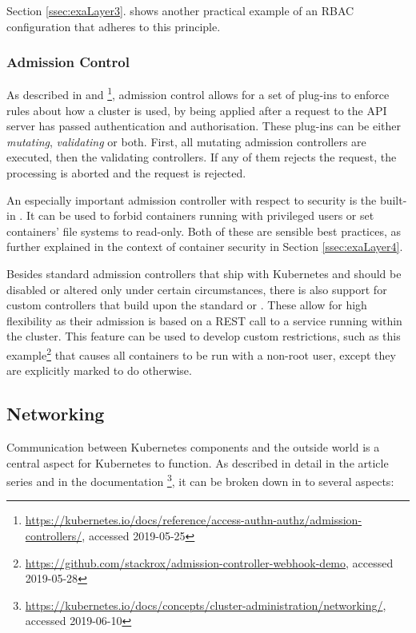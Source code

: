 Section \ref{ssec:exaLayer3}. shows another practical example of an \ac{RBAC} configuration that adheres to this principle.

\subsubsection{Admission Control} \label{ssec:admissionControl}

As described in \cite{admissionControl} and \cite{k8sdocs}\footnote{\url{https://kubernetes.io/docs/reference/access-authn-authz/admission-controllers/}, accessed 2019-05-25}, admission control allows for a set of plug-ins to enforce rules about how a cluster is used, by being applied after a request to the API server has passed authentication and authorisation. These plug-ins can be either \textit{mutating}, \textit{validating} or both. First, all mutating admission controllers are executed, then the validating controllers. If any of them rejects the request, the processing is aborted and the request is rejected.

An especially important admission controller with respect to security is the built-in . It can be used to forbid containers running with privileged users or set containers' file systems to read-only. Both of these are sensible best practices, as further explained in the context of container security in Section \ref{ssec:exaLayer4}.

Besides standard admission controllers that ship with Kubernetes and should be disabled or altered only under certain circumstances, there is also support for custom controllers that build upon the standard  or . These allow for high flexibility as their admission is based on a REST call to a service running within the cluster. This feature can be used to develop custom restrictions, such as this example\footnote{\url{https://github.com/stackrox/admission-controller-webhook-demo}, accessed 2019-05-28} that causes all containers to be run with a non-root user, except they are explicitly marked to do otherwise. 

\subsection{Networking} \label{ssec:networking}

Communication between Kubernetes components and the outside world is a central aspect for Kubernetes to function. As described in detail in the article series \textcite{NetworkingExplained} and in the documentation \textcite{k8sdocs}\footnote{\url{https://kubernetes.io/docs/concepts/cluster-administration/networking/}, accessed 2019-06-10}, it can be broken down in to several aspects:

